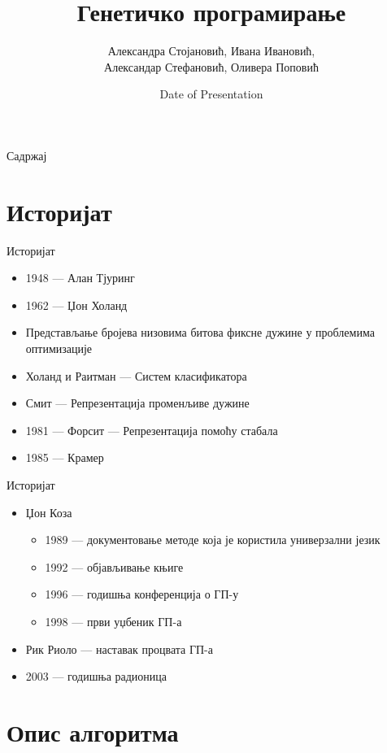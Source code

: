 \documentclass{beamer}
\title[Генетичко програмирање]{Генетичко програмирање}
\author{Александра Стојановић, Ивана Ивановић,\\ Александар Стефановић, Оливера Поповић}
\institute{Математички факултет}
\date{Date of Presentation}
\begin{document}
\begin{frame}
  \titlepage
\end{frame}

\begin{frame}{Садржај}
  \tableofcontents
\end{frame}

\section{Историјат}

	\begin{frame}{Историјат}
		\begin{itemize}
			\item 1948 — Алан Тјуринг
			\item 1962 — Џон Холанд
			\item Представљање бројева низовима битова фиксне дужине у проблемима оптимизације
			\item Холанд и Раитман — Систем класификатора
			\item Смит — Репрезентација променљиве дужине
			\item 1981 — Форсит — Репрезентација помоћу стабала
			\item 1985 — Крамер
		\end{itemize}
	\end{frame}

	\begin{frame}{Историјат}
		\begin{itemize}
			\item Џон Коза
			\begin{itemize}
				\item 1989 — документовање методе која је користила универзални језик
                \item 1992 — објављивање књиге
                \item 1996 — годишња конференција о ГП-у
                \item 1998 — први уџбеник ГП-а
			\end{itemize}
			\item Рик Риоло — наставак процвата ГП-а
			\item 2003 — годишња радионица
		\end{itemize}
	\end{frame}

\section{Опис алгоритма}
\end{document}
